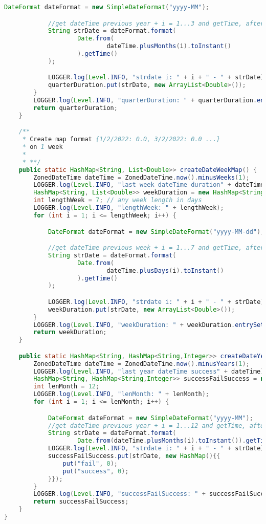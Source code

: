 \begin{lstlisting}[language=Java]
            DateFormat dateFormat = new SimpleDateFormat("yyyy-MM");

            //get dateTime previous year + i = 1...3 and getTime, after in strDate=2022-03
            String strDate = dateFormat.format(
                    Date.from(
                            dateTime.plusMonths(i).toInstant()
                    ).getTime()
            );

            LOGGER.log(Level.INFO, "strdate i: " + i + " - " + strDate);
            quarterDuration.put(strDate, new ArrayList<Double>());
        }
        LOGGER.log(Level.INFO, "quarterDuration: " + quarterDuration.entrySet());
        return quarterDuration;
    }

    /**
     * Create map format {1/2/2022: 0.0, 3/2/2022: 0.0 ...}
     * on 1 week
     *
     * **/
    public static HashMap<String, List<Double>> createDateWeekMap() {
        ZonedDateTime dateTime = ZonedDateTime.now().minusWeeks(1);
        LOGGER.log(Level.INFO, "last week dateTime duration" + dateTime);
        HashMap<String, List<Double>> weekDuration = new HashMap<String, List<Double>>();
        int lengthWeek = 7; // any week length in days
        LOGGER.log(Level.INFO, "lengthWeek: " + lengthWeek);
        for (int i = 1; i <= lengthWeek; i++) {

            DateFormat dateFormat = new SimpleDateFormat("yyyy-MM-dd");

            //get dateTime previous week + i = 1...7 and getTime, after in strDate=2022-03-01
            String strDate = dateFormat.format(
                    Date.from(
                            dateTime.plusDays(i).toInstant()
                    ).getTime()
            );

            LOGGER.log(Level.INFO, "strdate i: " + i + " - " + strDate);
            weekDuration.put(strDate, new ArrayList<Double>());
        }
        LOGGER.log(Level.INFO, "weekDuration: " + weekDuration.entrySet());
        return weekDuration;
    }

    public static HashMap<String, HashMap<String,Integer>> createDateYearMapSuccessRate() {
        ZonedDateTime dateTime = ZonedDateTime.now().minusYears(1);
        LOGGER.log(Level.INFO, "last year dateTime success" + dateTime);
        HashMap<String, HashMap<String,Integer>> successFailSuccess = new HashMap();
        int lenMonth = 12;
        LOGGER.log(Level.INFO, "lenMonth: " + lenMonth);
        for (int i = 1; i <= lenMonth; i++) {

            DateFormat dateFormat = new SimpleDateFormat("yyyy-MM");
            //get dateTime previous year + i = 1...12 and getTime, after in strDate=2022-03
            String strDate = dateFormat.format(
                    Date.from(dateTime.plusMonths(i).toInstant()).getTime());
            LOGGER.log(Level.INFO, "strdate i: " + i + " - " + strDate);
            successFailSuccess.put(strDate, new HashMap(){{
                put("fail", 0);
                put("success", 0);
            }});
        }
        LOGGER.log(Level.INFO, "successFailSuccess: " + successFailSuccess.entrySet());
        return successFailSuccess;
    }
}







\end{lstlisting}
